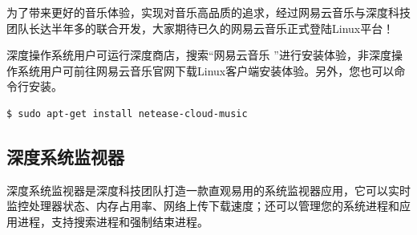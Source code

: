 \documentclass[doctor,openright,twoside]{sjtuthesis}
\theoremstyle{plain}
\theoremstyle{definition}
\theoremstyle{remark}
\theoremstyle{ocrenumbox}
\theoremstyle{plain}
\newcommand\cqh{“}
\newcommand\cqt{”}
\begin{document}
为了带来更好的音乐体验，实现对音乐高品质的追求，经过网易云音乐与深度科技团队长达半年多的联合开发，大家期待已久的网易云音乐正式登陆Linux平台！


深度操作系统用户可运行深度商店，搜索\cqh 网易云音乐
\cqt 进行安装体验，非深度操作系统用户可前往网易云音乐官网下载Linux客户端安装体验。另外，您也可以命令行安装。

\begin{lstlisting}[language=bash]
$ sudo apt-get install netease-cloud-music
\end{lstlisting}

\subsection{深度系统监视器}

深度系统监视器是深度科技团队打造一款直观易用的系统监视器应用，它可以实时监控处理器状态、内存占用率、网络上传下载速度；还可以管理您的系统进程和应用进程，支持搜索进程和强制结束进程。
\end{document}

